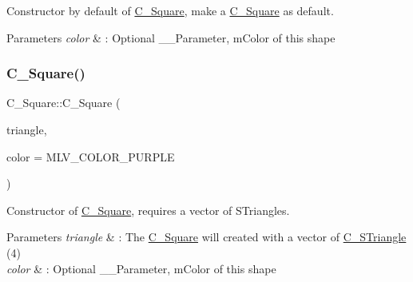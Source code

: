 Constructor by default of \hyperlink{classC__Square}{C\+\_\+\+Square}, make a \hyperlink{classC__Square}{C\+\_\+\+Square} as default. 


\begin{DoxyParams}{Parameters}
{\em color} & \+: Optional \+\_\+\+\_\+\+Parameter, m\+Color of this shape \\
\hline
\end{DoxyParams}
\mbox{\label{classC__Square_a6e100fed46e6b54971674c60a5f1d87b}} 
\subsubsection{\texorpdfstring{C\+\_\+\+Square()}{C\_Square()}\hspace{0.1cm}{\footnotesize\ttfamily [2/3]}}
{\footnotesize\ttfamily C\+\_\+\+Square\+::\+C\+\_\+\+Square (\begin{DoxyParamCaption}\item[{const std\+::vector$<$ \hyperlink{classC__STriangle}{C\+\_\+\+S\+Triangle} $>$ \&}]{triangle,  }\item[{M\+L\+V\+\_\+\+Color}]{color = {\ttfamily MLV\+\_\+COLOR\+\_\+PURPLE} }\end{DoxyParamCaption})\hspace{0.3cm}{\ttfamily [explicit]}}



Constructor of \hyperlink{classC__Square}{C\+\_\+\+Square}, requires a vector of S\+Triangles. 


\begin{DoxyParams}{Parameters}
{\em triangle} & \+: The \hyperlink{classC__Square}{C\+\_\+\+Square} will created with a vector of \hyperlink{classC__STriangle}{C\+\_\+\+S\+Triangle} (4) \\
\hline
{\em color} & \+: Optional \+\_\+\+\_\+\+Parameter, m\+Color of this shape \\
\hline
\end{DoxyParams}
\mbox{\label{classC__Square_ac1c9c3504fff971ec8cdbec9f97b020b}} 
